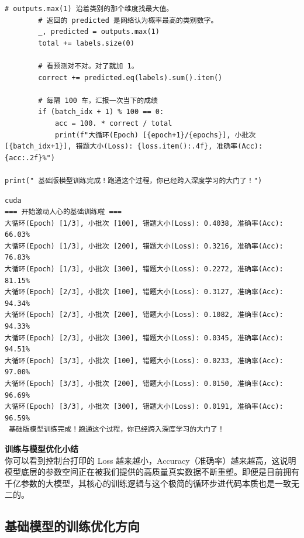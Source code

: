 \documentclass[10pt]{article}
\numberwithin{equation}{section}
\theoremstyle{plain}
\theoremstyle{definition}
\theoremstyle{remark}
\begin{document}
\begin{CodeBox}
\begin{lstlisting}[style=PythonStyle]
        # outputs.max(1) 沿着类别的那个维度找最大值。
        # 返回的 predicted 是网络认为概率最高的类别数字。
        _, predicted = outputs.max(1)
        total += labels.size(0) 
        
        # 看预测对不对。对了就加 1。
        correct += predicted.eq(labels).sum().item()
        
        # 每隔 100 车，汇报一次当下的成绩
        if (batch_idx + 1) % 100 == 0:
            acc = 100. * correct / total
            print(f"大循环(Epoch) [{epoch+1}/{epochs}], 小批次 [{batch_idx+1}], 错题大小(Loss): {loss.item():.4f}, 准确率(Acc): {acc:.2f}%")

print(" 基础版模型训练完成！跑通这个过程，你已经跨入深度学习的大门了！")
\end{lstlisting}
\end{CodeBox}

\begin{OutputBox}
	\begin{lstlisting}[style=PythonStyle, backgroundcolor=\color{black!5}]
cuda
=== 开始激动人心的基础训练啦 ===
大循环(Epoch) [1/3], 小批次 [100], 错题大小(Loss): 0.4038, 准确率(Acc): 66.03%
大循环(Epoch) [1/3], 小批次 [200], 错题大小(Loss): 0.3216, 准确率(Acc): 76.83%
大循环(Epoch) [1/3], 小批次 [300], 错题大小(Loss): 0.2272, 准确率(Acc): 81.15%
大循环(Epoch) [2/3], 小批次 [100], 错题大小(Loss): 0.3127, 准确率(Acc): 94.34%
大循环(Epoch) [2/3], 小批次 [200], 错题大小(Loss): 0.1082, 准确率(Acc): 94.33%
大循环(Epoch) [2/3], 小批次 [300], 错题大小(Loss): 0.0345, 准确率(Acc): 94.51%
大循环(Epoch) [3/3], 小批次 [100], 错题大小(Loss): 0.0233, 准确率(Acc): 97.00%
大循环(Epoch) [3/3], 小批次 [200], 错题大小(Loss): 0.0150, 准确率(Acc): 96.69%
大循环(Epoch) [3/3], 小批次 [300], 错题大小(Loss): 0.0191, 准确率(Acc): 96.59%
 基础版模型训练完成！跑通这个过程，你已经跨入深度学习的大门了！
\end{lstlisting}
\end{OutputBox}

\begin{SummaryBox}
	\textbf{训练与模型优化小结} \\
	你可以看到控制台打印的 Loss 越来越小，Accuracy（准确率）越来越高，这说明模型底层的参数空间正在被我们提供的高质量真实数据不断重塑。即便是目前拥有千亿参数的大模型，其核心的训练逻辑与这个极简的循环步进代码本质也是一致无二的。
\end{SummaryBox}

\subsection{基础模型的训练优化方向}
\end{document}
